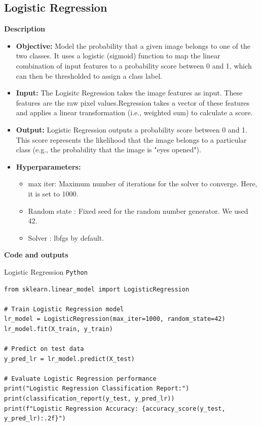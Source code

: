 \documentclass{modeleRapport}
\begin{document}
\newpage

\subsection{Logistic Regression}

\bigskip

\textbf{Description\\}

\begin{itemize}
    \item \textbf{Objective:} Model the probability that a given image belongs to one of the two classes.
    It uses a logistic (sigmoid) function to map the linear combination of input features to a probability score between 0 and 1, which can then be thresholded to assign a class label.

    \item \textbf{Input:} The Logisitc Regression takes the image features as input. These features are the raw pixel values.Regression takes a vector of these features and applies a linear transformation (i.e., weighted sum) to calculate a score.

    \item \textbf{Output:} Logistic Regression outputs a probability score between 0 and 1. This score represents the likelihood that the image belongs to a particular class (e.g., the probability that the image is "eyes opened").

    \item \textbf{Hyperparameters:}
    \begin{itemize}
        \item max iter: Maximum number of iterations for the solver to converge. Here, it is set to 1000.
        \item Random state : Fixed seed for the random number generator. We used 42.
        \item Solver : lbfgs by default.
    \end{itemize}
   
\end{itemize}
\bigskip
\bigskip
\textbf{Code and outputs\\}
\begin{codebox}[LR Classifier]{Logistic Regression \texttt{Python}}
\begin{lstlisting}
from sklearn.linear_model import LogisticRegression

# Train Logistic Regression model
lr_model = LogisticRegression(max_iter=1000, random_state=42)
lr_model.fit(X_train, y_train)

# Predict on test data
y_pred_lr = lr_model.predict(X_test)

# Evaluate Logistic Regression performance
print("Logistic Regression Classification Report:")
print(classification_report(y_test, y_pred_lr))
print(f"Logistic Regression Accuracy: {accuracy_score(y_test, y_pred_lr):.2f}")
\end{lstlisting}
\end{codebox}
\end{document}
